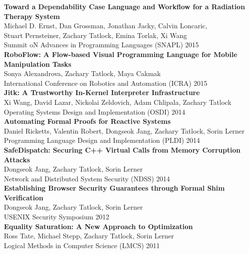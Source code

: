 \documentclass[10pt]{article}
\begin{document}
\textbf{%
Toward a Dependability Case Language and Workflow for a Radiation Therapy System
} \\
Michael D. Ernst, Dan Grossman, Jonathan Jacky, Calvin Loncaric, \\
Stuart Pernsteiner, Zachary Tatlock, Emina Torlak, Xi Wang \\
Summit oN Advances in Programming Languages (SNAPL) 2015 \\

\textbf{%
RoboFlow: A Flow-based Visual Programming Language for Mobile Manipulation Tasks
} \\
Sonya Alexandrova, Zachary Tatlock, Maya Cakmak \\
International Conference on Robotics and Automation (ICRA) 2015 \\

\textbf{%
Jitk: A Trustworthy In-Kernel Interpreter Infrastructure
} \\
Xi Wang, David Lazar, Nickolai Zeldovich, Adam Chlipala, Zachary Tatlock \\
Operating Systems Design and Implementation (OSDI) 2014 \\

\textbf{%
Automating Formal Proofs for Reactive Systems
} \\
Daniel Ricketts, Valentin Robert, Dongseok Jang, Zachary Tatlock, Sorin Lerner \\
Programming Language Design and Implementation (PLDI) 2014 \\

\textbf{%
SafeDispatch: Securing C++ Virtual Calls from Memory Corruption Attacks
} \\
Dongseok Jang, Zachary Tatlock, Sorin Lerner \\
Network and Distributed System Security (NDSS) 2014 \\

\textbf{%
Establishing Browser Security Guarantees through Formal Shim Verification
} \\
Dongseok Jang, Zachary Tatlock, Sorin Lerner \\
USENIX Security Symposium 2012 \\

\textbf{%
Equality Saturation: A New Approach to Optimization
} \\
Ross Tate, Michael Stepp, Zachary Tatlock, Sorin Lerner \\
Logical Methods in Computer Science (LMCS) 2011 \\
\end{document}

